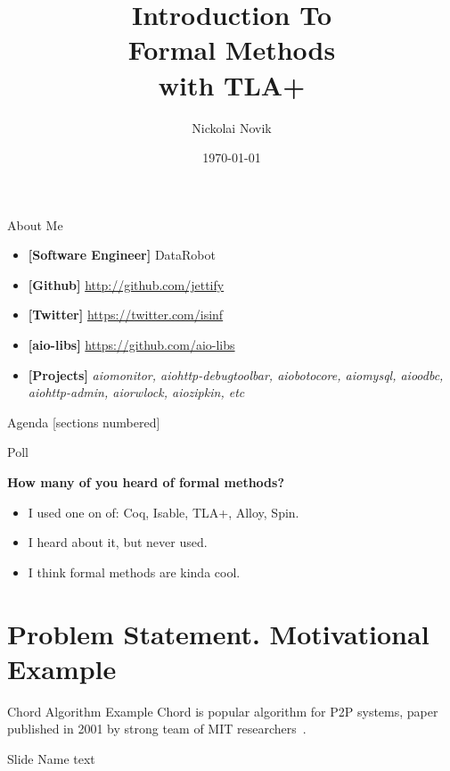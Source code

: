 \documentclass[12pt]{beamer}
\title{Introduction To \\ Formal Methods \\ with TLA+}
\date{\today}
\author{Nickolai Novik}
\institute{\href{http://github.com/jettify}{http://github.com/jettify}}
\begin{document}
  \maketitle
  \begin{frame}{About Me}
    \begin{itemize}
        \item \textbf{[Software Engineer]}  DataRobot
        \item \textbf{[Github]}
            \href{http://github.com/jettify}{http://github.com/jettify}
        \item \textbf{[Twitter]}
            \href{https://twitter.com/isinf}{https://twitter.com/isinf}
        \item \textbf{[aio-libs]}
            \href{https://github.com/aio-libs}{https://github.com/aio-libs}
        \item \textbf{[Projects]}
            \textit{aiomonitor, aiohttp-debugtoolbar,
          aiobotocore, aiomysql, aioodbc, aiohttp-admin, aiorwlock,
          aiozipkin, etc}
    \end{itemize}
  \end{frame}
  \begin{frame}[squeeze]{Agenda}
      [sections numbered]
      \tableofcontents
  \end{frame}
  \begin{frame}{Poll}
      \begin{large}
          \textbf{How many of you heard of formal methods?}
      \end{large}
    \begin{itemize}
      \item I used one on of: Coq, Isable, TLA+, Alloy, Spin.
      \item I heard about it, but never used.
      \item I think formal methods are kinda cool.
    \end{itemize}
  \end{frame}
  \section{Problem Statement. Motivational Example}
  \begin{frame}{Chord Algorithm Example}
      Chord is popular algorithm for P2P systems, paper published in 2001
      by strong team of MIT researchers~\cite{stoica2001chord, Zave15}.
  \end{frame}
  \begin{frame}{Slide Name}
      text
  \end{frame}
\end{document}
